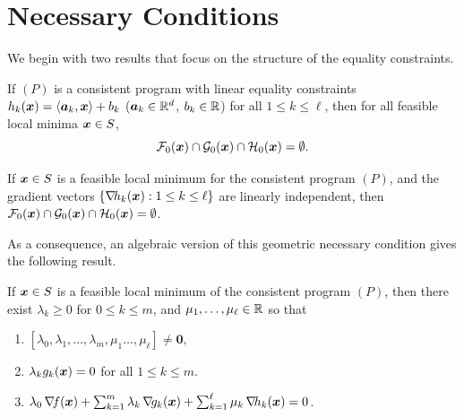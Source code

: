 
\section{Necessary Conditions}
We begin with two results that focus on the structure of the equality constraints.
\begin{theorem}
If $(P)$ is a consistent program with linear equality constraints $h_k(\boldsymbol{x}) = \langle \boldsymbol{a}_k, \boldsymbol{x} \rangle + b_k$ ($\boldsymbol{a}_k \in \mathbb{R}^d$, $b_k \in \mathbb{R}$) for all $1 \leq k \leq \ell$, then for all feasible local minima $\boldsymbol{x} \in S$,
\begin{equation*}
\mathcal{F}_0(\boldsymbol{x}) \cap \mathcal{G}_0(\boldsymbol{x}) \cap \mathcal{H}_0(\boldsymbol{x}) = \emptyset.
\end{equation*}
\end{theorem}

\begin{theorem}
If $\boldsymbol{x} \in S$ is a feasible local minimum for the consistent program $(P)$, and the gradient vectors $\{ \mathop{\nabla\! {h_k}}(\boldsymbol{x}) : 1 \leq k \leq \ell \}$ are linearly independent, then $\mathcal{F}_0(\boldsymbol{x}) \cap \mathcal{G}_0(\boldsymbol{x}) \cap \mathcal{H}_0(\boldsymbol{x}) = \emptyset$.
\end{theorem}

\separator

As a consequence, an algebraic version of this geometric necessary condition gives the following result.

\begin{theorem}\label{theorem:FritzJohn}
If $\boldsymbol{x} \in S$ is a feasible local minimum of the consistent program $(P)$, then there exist $\lambda_k \geq 0$ for $0\leq k \leq m$, and $\mu_1, \dots, \mu_\ell \in \mathbb{R}$ so that
\begin{enumerate}
 	\item $[\lambda_0, \lambda_1, \dotsc, \lambda_m, \mu_1 \dotsc, \mu_\ell ] \neq \boldsymbol{0}$,
 	\item $\lambda_k g_k(\boldsymbol{x}) = 0$ for all $1 \leq k \leq m$.
 	\item $\lambda_0 \mathop{\nabla\! {f}}(\boldsymbol{x}) + \sum_{k=1}^m \lambda_k \mathop{\nabla\! {g_k}}(\boldsymbol{x}) + \sum_{k=1}^\ell \mu_k \mathop{\nabla\! {h_k}}(\boldsymbol{x}) = 0$.
 \end{enumerate}
\end{theorem}

